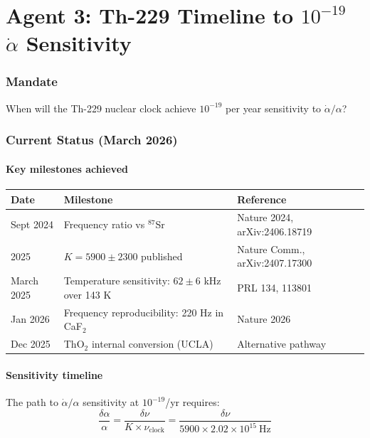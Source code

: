 \documentclass[11pt,a4paper]{article}
\begin{document}
\part{Agent 3: Th-229 Timeline to $10^{-19}$ $\dot{\alpha}$ Sensitivity}
\label{part:agent3}

\section{Mandate}

When will the Th-229 nuclear clock achieve $10^{-19}$ per year sensitivity to $\dot{\alpha}/\alpha$?

\section{Current Status (March 2026)}

\subsection{Key milestones achieved}

\begin{center}
\begin{longtable}{p{3cm}p{4cm}p{5cm}}
\toprule
\textbf{Date} & \textbf{Milestone} & \textbf{Reference} \\
\midrule
\endhead
Sept 2024 & Frequency ratio vs $^{87}$Sr & Nature 2024, arXiv:2406.18719 \\
\midrule
2025 & $K = 5900 \pm 2300$ published & Nature Comm., arXiv:2407.17300 \\
\midrule
March 2025 & Temperature sensitivity: $62 \pm 6$ kHz over 143 K & PRL 134, 113801 \\
\midrule
Jan 2026 & Frequency reproducibility: 220 Hz in CaF$_2$ & Nature 2026 \\
\midrule
Dec 2025 & ThO$_2$ internal conversion (UCLA) & Alternative pathway \\
\bottomrule
\end{longtable}
\end{center}

\subsection{Sensitivity timeline}

The path to $\dot{\alpha}/\alpha$ sensitivity at $10^{-19}$/yr requires:
\begin{equation}
\frac{\delta\alpha}{\alpha} = \frac{\delta\nu}{K \times \nu_{\text{clock}}} = \frac{\delta\nu}{5900 \times 2.02 \times 10^{15}~\text{Hz}}
\end{equation}
\end{document}
